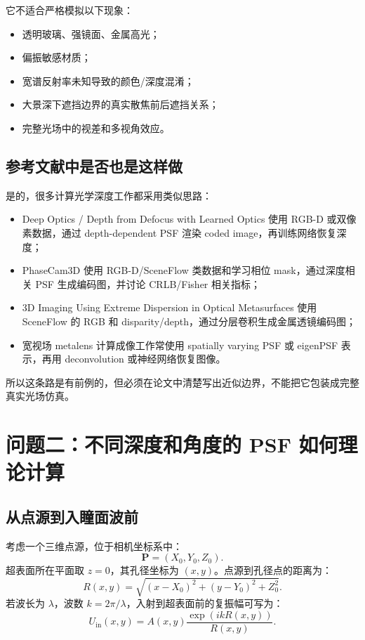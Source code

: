 \documentclass[11pt,a4paper,fontset=none]{ctexart}
\begin{document}
它不适合严格模拟以下现象：
\begin{itemize}
  \item 透明玻璃、强镜面、金属高光；
  \item 偏振敏感材质；
  \item 宽谱反射率未知导致的颜色/深度混淆；
  \item 大景深下遮挡边界的真实散焦前后遮挡关系；
  \item 完整光场中的视差和多视角效应。
\end{itemize}

\subsection{参考文献中是否也是这样做}

是的，很多计算光学深度工作都采用类似思路：
\begin{itemize}
  \item Deep Optics / Depth from Defocus with Learned Optics 使用 RGB-D 或双像素数据，通过 depth-dependent PSF 渲染 coded image，再训练网络恢复深度；
  \item PhaseCam3D 使用 RGB-D/SceneFlow 类数据和学习相位 mask，通过深度相关 PSF 生成编码图，并讨论 CRLB/Fisher 相关指标；
  \item 3D Imaging Using Extreme Dispersion in Optical Metasurfaces 使用 SceneFlow 的 RGB 和 disparity/depth，通过分层卷积生成金属透镜编码图；
  \item 宽视场 metalens 计算成像工作常使用 spatially varying PSF 或 eigenPSF 表示，再用 deconvolution 或神经网络恢复图像。
\end{itemize}

所以这条路是有前例的，但必须在论文中清楚写出近似边界，不能把它包装成完整真实光场仿真。

\section{问题二：不同深度和角度的 PSF 如何理论计算}

\subsection{从点源到入瞳面波前}

考虑一个三维点源，位于相机坐标系中：
\begin{equation}
  \bm P=(X_0,Y_0,Z_0).
\end{equation}
超表面所在平面取 $z=0$，其孔径坐标为 $(x,y)$。点源到孔径点的距离为：
\begin{equation}
  R(x,y)
  =
  \sqrt{(x-X_0)^2+(y-Y_0)^2+Z_0^2}.
\end{equation}
若波长为 $\lambda$，波数 $k=2\pi/\lambda$，入射到超表面前的复振幅可写为：
\begin{equation}
  U_{\mathrm{in}}(x,y)
  =
  A(x,y)
  \frac{\exp\left(ikR(x,y)\right)}{R(x,y)}.
\end{equation}
\end{document}

